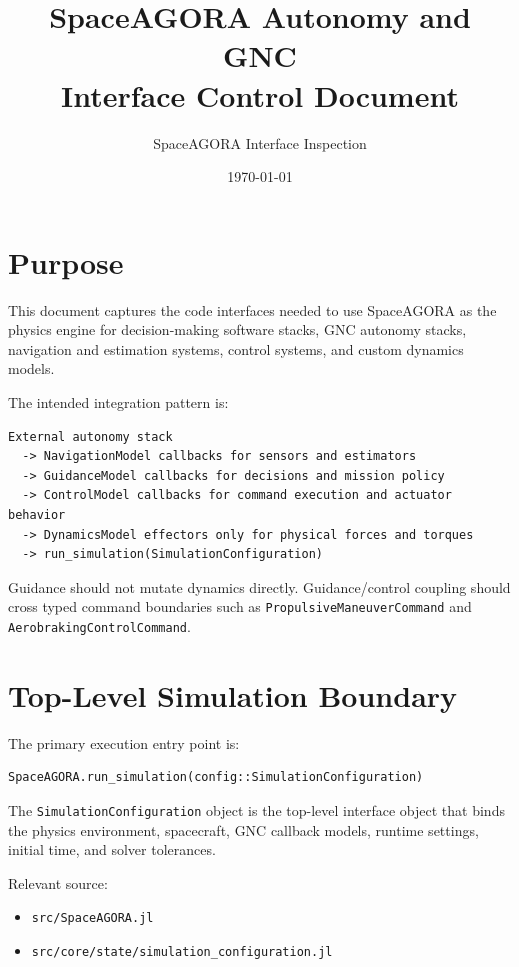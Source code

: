 \documentclass[11pt]{article}
\title{SpaceAGORA Autonomy and GNC\\Interface Control Document}
\author{SpaceAGORA Interface Inspection}
\date{\today}
\begin{document}
\maketitle
\tableofcontents
\newpage

\section{Purpose}

This document captures the code interfaces needed to use SpaceAGORA as the
physics engine for decision-making software stacks, GNC autonomy stacks,
navigation and estimation systems, control systems, and custom dynamics models.

The intended integration pattern is:

\begin{lstlisting}
External autonomy stack
  -> NavigationModel callbacks for sensors and estimators
  -> GuidanceModel callbacks for decisions and mission policy
  -> ControlModel callbacks for command execution and actuator behavior
  -> DynamicsModel effectors only for physical forces and torques
  -> run_simulation(SimulationConfiguration)
\end{lstlisting}

Guidance should not mutate dynamics directly. Guidance/control coupling should
cross typed command boundaries such as \texttt{PropulsiveManeuverCommand} and
\texttt{AerobrakingControlCommand}.

\section{Top-Level Simulation Boundary}

The primary execution entry point is:

\begin{lstlisting}
SpaceAGORA.run_simulation(config::SimulationConfiguration)
\end{lstlisting}

The \texttt{SimulationConfiguration} object is the top-level interface object
that binds the physics environment, spacecraft, GNC callback models, runtime
settings, initial time, and solver tolerances.

Relevant source:
\begin{itemize}
  \item \texttt{src/SpaceAGORA.jl}
  \item \texttt{src/core/state/simulation\_configuration.jl}
\end{itemize}
\end{document}
